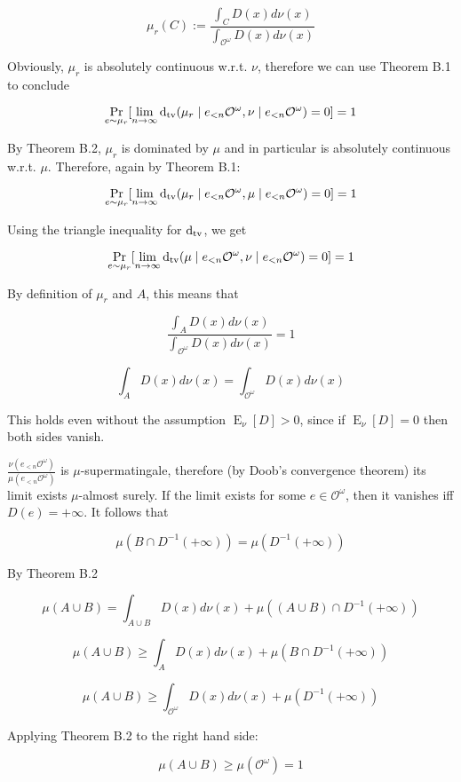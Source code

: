 \documentclass[a4paper]{article}
\DeclareMathOperator{\Prb}{Pr}
\DeclareMathOperator{\E}{E}
\newcommand{\Dtv}{\operatorname{d}_{\textnormal{tv}}}
\newcommand{\Obs}{\mathcal{O}}
\newcommand{\ObsO}{\Obs^\omega}
\begin{document}
$$\mu_r(C):=\frac{\int_{C} D(x) d\nu(x)}{\int_{\ObsO} D(x) d\nu(x)}$$

Obviously, ${\mu_r}$ is absolutely continuous w.r.t. ${\nu}$, therefore we can use Theorem B.1 to conclude

$$\Prb_{e \sim \mu_r}[\lim_{n \rightarrow \infty} \Dtv(\mu_r \mid e_{<n}\ObsO, \nu \mid e_{<n}\ObsO) = 0] = 1$$

By Theorem B.2, ${\mu_r}$ is dominated by ${\mu}$ and in particular is absolutely continuous w.r.t. ${\mu}$. Therefore, again by Theorem B.1:

$$\Prb_{e \sim \mu_r}[\lim_{n \rightarrow \infty} \Dtv(\mu_r \mid e_{<n}\ObsO, \mu \mid e_{<n}\ObsO) = 0] = 1$$

Using the triangle inequality for ${\Dtv}$, we get

$$\Prb_{e \sim \mu_r}[\lim_{n \rightarrow \infty} \Dtv(\mu \mid e_{<n}\ObsO, \nu \mid e_{<n}\ObsO) = 0] = 1$$

By definition of ${\mu_r}$ and ${A}$, this means that

$$\frac{\int_{A} D(x) d\nu(x)}{\int_{\ObsO} D(x) d\nu(x)} = 1$$

$$\int_{A} D(x) d\nu(x) = \int_{\ObsO} D(x) d\nu(x)$$

This holds even without the assumption ${\E_\nu[D] > 0}$, since if ${\E_\nu[D] = 0}$ then both sides vanish.

${\frac{\nu(e_{<n}\ObsO)}{\mu(e_{<n}\ObsO)}}$ is ${\mu}$-supermatingale, therefore (by Doob's convergence theorem) its limit exists ${\mu}$-almost surely. If the limit exists for some ${e \in \ObsO}$, then it vanishes iff ${D(e)=+\infty}$. It follows that

$$\mu(B \cap D^{-1}(+\infty)) = \mu(D^{-1}(+\infty))$$

By Theorem B.2

$$\mu(A \cup B) = \int_{A \cup B} D(x) d\nu(x) + \mu((A \cup B) \cap D^{-1}(+\infty))$$

$$\mu(A \cup B) \geq \int_{A} D(x) d\nu(x) + \mu(B \cap D^{-1}(+\infty))$$

$$\mu(A \cup B) \geq \int_{\ObsO} D(x) d\nu(x) + \mu(D^{-1}(+\infty))$$

Applying Theorem B.2 to the right hand side:

$$\mu(A \cup B) \geq \mu(\ObsO) = 1$$
\end{document}
